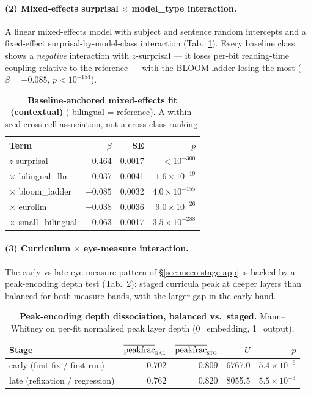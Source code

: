 \paragraph{(2) Mixed-effects surprisal $\times$ model\_type interaction.} A linear mixed-effects model with subject and sentence random intercepts and a fixed-effect surprisal-by-model-class interaction (Tab.~\ref{tab:sig_mixedlm_baselines}). Every baseline class shows a \emph{negative} interaction with $z$-surprisal --- it loses per-bit reading-time coupling relative to the \beetle{} reference --- with the BLOOM ladder losing the most ($\beta=-0.085$, $p<10^{-154}$).
 
\begin{table}[!ht]
  \centering \small
  \caption{\textbf{Baseline-anchored mixed-effects fit (contextual)} (\beetle{} bilingual = reference). A within-seed cross-cell association, not a cross-class ranking.}
  \label{tab:sig_mixedlm_baselines}
  \begin{tabular}{lrrr}
    \toprule
    Term & $\beta$ & SE & $p$ \\
    \midrule
    $z$-surprisal                          & $+0.464$ & 0.0017 & $<10^{-300}$ \\
    \quad $\times$ bilingual\_llm          & $-0.037$ & 0.0041 & $1.6{\times}10^{-19}$ \\
    \quad $\times$ bloom\_ladder           & $-0.085$ & 0.0032 & $4.0{\times}10^{-155}$ \\
    \quad $\times$ eurollm                 & $-0.038$ & 0.0036 & $9.0{\times}10^{-26}$ \\
    \quad $\times$ small\_bilingual        & $+0.063$ & 0.0017 & $3.5{\times}10^{-288}$ \\
    \bottomrule
  \end{tabular}
\end{table}
 
\paragraph{(3) Curriculum $\times$ eye-measure interaction.} The early-vs-late eye-measure pattern of \S\ref{sec:meco-stage-app} is backed by a peak-encoding depth test (Tab.~\ref{tab:sig_decomp_dissociation}): staged curricula peak at deeper layers than balanced for both measure bands, with the larger gap in the early band.
 
\begin{table}[!ht]
  \centering \small
  \caption{\textbf{Peak-encoding depth dissociation, balanced vs.\ staged.} Mann--Whitney on per-fit normalised peak layer depth (0=embedding, 1=output).}
  \label{tab:sig_decomp_dissociation}
  \begin{tabular}{lrrrr}
    \toprule
    Stage & $\overline{\text{peakfrac}}_\textsc{bal}$ & $\overline{\text{peakfrac}}_\textsc{stg}$ & $U$ & $p$ \\
    \midrule
    early (first-fix / first-run) & 0.702 & 0.809 & 6767.0 & $5.4{\times}10^{-6}$ \\
    late (refixation / regression) & 0.762 & 0.820 & 8055.5 & $5.5{\times}10^{-3}$ \\
    \bottomrule
  \end{tabular}
\end{table}
 
